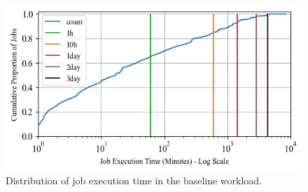 \documentclass[a4paper,fleqn]{cas-dc}
\begin{document}
\begin{figure}[tbp]
\centering
    \includegraphics[clip,width=0.7\linewidth,trim={0.1cm 0.1cm 0.1cm 0.1cm}]{figures/distrib_job_size.png}
    \caption{Distribution of job execution time in the baseline workload.}
    \label{fig:wl_distrib_cum}
\end{figure}
\end{document}
